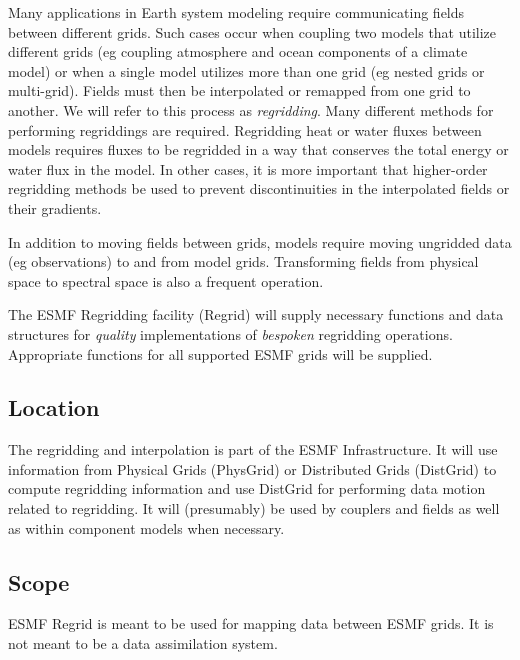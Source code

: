 
Many applications in Earth system modeling require
communicating fields between different grids.  Such
cases occur when coupling two models that utilize
different grids (eg coupling atmosphere and ocean
components of a climate model) or when a single model
utilizes more than one grid (eg nested grids or multi-grid).
Fields must then be interpolated or remapped
from one grid to another.  We will refer to this process
as {\em regridding}. Many different methods
for performing regriddings are required.
Regridding heat or water fluxes between models requires
fluxes to be regridded in a way that conserves
the total energy or water flux in the model.  In other
cases, it is more important that higher-order
regridding methods be used to prevent discontinuities
in the interpolated fields or their gradients.

In addition to moving fields between grids,
models require moving ungridded data (eg observations)
to and from model grids.  Transforming fields
from physical space to spectral space is also
a frequent operation.

The ESMF Regridding facility (Regrid) will
supply necessary functions and data structures for
{\em quality} implementations of {\em bespoken} regridding
operations.  Appropriate functions for all supported
ESMF grids will be supplied.

\subsection{Location}

The regridding and interpolation is part of the ESMF
Infrastructure.  It will use information from Physical
Grids (PhysGrid) or Distributed Grids (DistGrid) to compute
regridding information and use DistGrid
for performing data motion related to regridding.  It will
(presumably) be used by couplers and fields as well as
within component models when necessary.

\subsection{Scope}

ESMF Regrid is meant to be used for mapping data
between ESMF grids.  It is not meant to be a data
assimilation system.

